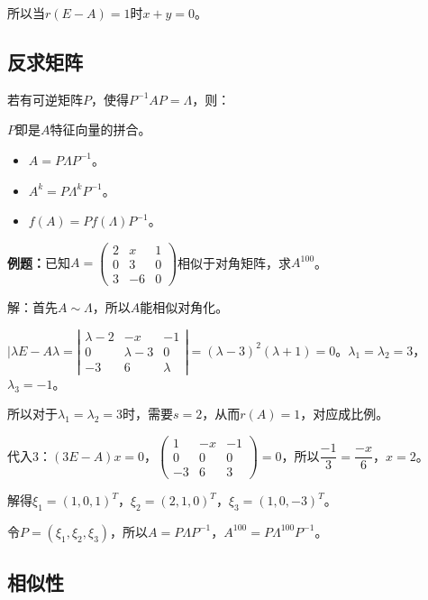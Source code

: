 \documentclass[UTF8, 12pt]{ctexart}
\begin{document}
所以当$r(E-A)=1$时$x+y=0$。

\subsection{反求矩阵}

若有可逆矩阵$P$，使得$P^{-1}AP=\Lambda$，则：

$P$即是$A$特征向量的拼合。

\begin{itemize}
    \item $A=P\Lambda P^{-1}$。
    \item $A^k=P\Lambda^kP^{-1}$。
    \item $f(A)=Pf(\Lambda)P^{-1}$。
\end{itemize}

\textbf{例题：}已知$A=\left(\begin{array}{ccc}
    2 & x & 1 \\
    0 & 3 & 0 \\
    3 & -6 & 0
\end{array}\right)$相似于对角矩阵，求$A^{100}$。\medskip

解：首先$A\sim\Lambda$，所以$A$能相似对角化。

$\vert\lambda E-A\lambda=\left|\begin{array}{ccc}
    \lambda-2 & -x & -1 \\
    0 & \lambda-3 & 0 \\
    -3 & 6 & \lambda
\end{array}\right|=(\lambda-3)^2(\lambda+1)=0$。$\lambda_1=\lambda_2=3$，$\lambda_3=-1$。

所以对于$\lambda_1=\lambda_2=3$时，需要$s=2$，从而$r(A)=1$，对应成比例。

代入3：$(3E-A)x=0$，$\left(\begin{array}{ccc}
    1 & -x & -1 \\
    0 & 0 & 0 \\
    -3 & 6 & 3
\end{array}\right)=0$，所以$\dfrac{-1}{3}=\dfrac{-x}{6}$，$x=2$。

解得$\xi_1=(1,0,1)^T$，$\xi_2=(2,1,0)^T$，$\xi_3=(1,0,-3)^T$。

令$P=(\xi_1,\xi_2,\xi_3)$，所以$A=P\Lambda P^{-1}$，$A^{100}=P\Lambda^{100}P^{-1}$。

\subsection{相似性}
\end{document}
